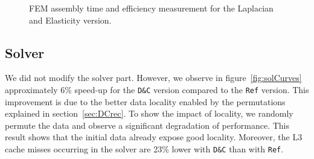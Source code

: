 \documentclass[10pt]{IOS-Book-Article}
\begin{document}
\begin{figure}[htp]
 \caption{FEM assembly time and efficiency measurement for the Laplacian and Elasticity version. }
 \label{fig:asmCurves}
\end{figure}

\subsection{Solver}
We did not modify the solver part. However, we observe in figure~\ref{fig:solCurves} approximately 6\% speed-up for the {\tt D\&C} version compared to the {\tt Ref} version.
This improvement is due to the better data locality enabled by the permutations explained in section~\ref{sec:DCrec}.
To show the impact of locality, we randomly permute the data and observe a significant degradation of performance.
This result shows that the initial data already expose good locality.
Moreover, the L3 cache misses occurring in the solver are 23\% lower with {\tt D\&C} than with {\tt Ref}.
\end{document}
